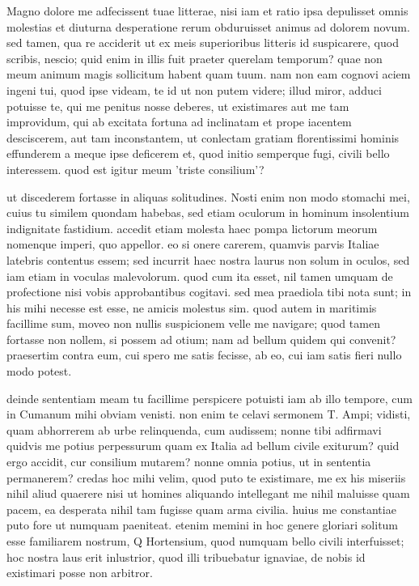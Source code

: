 


 Magno dolore me adfecissent tuae litterae, nisi iam et ratio ipsa depulisset omnis molestias et diuturna desperatione rerum obduruisset animus ad dolorem novum. sed tamen, qua re acciderit ut ex meis superioribus litteris id suspicarere, quod scribis, nescio; quid enim in illis fuit praeter querelam temporum? quae non meum animum magis sollicitum habent quam tuum. nam non eam cognovi aciem ingeni tui, quod ipse videam, te id ut non putem videre; illud miror, adduci potuisse te, qui me penitus nosse deberes, ut existimares aut me tam improvidum, qui ab excitata fortuna ad inclinatam et prope iacentem desciscerem, aut tam inconstantem, ut conlectam gratiam florentissimi hominis effunderem a meque ipse deficerem et, quod initio semperque fugi, civili bello interessem. quod est igitur meum 'triste consilium'?

 ut discederem fortasse in aliquas solitudines. Nosti enim non modo stomachi mei, cuius tu similem quondam habebas, sed etiam oculorum in hominum insolentium indignitate fastidium. accedit etiam molesta haec pompa lictorum meorum nomenque imperi, quo appellor. eo si onere carerem, quamvis parvis Italiae latebris contentus essem; sed incurrit haec nostra laurus non solum in oculos, sed iam etiam in voculas malevolorum. quod cum ita esset, nil tamen umquam de profectione nisi vobis approbantibus cogitavi. sed mea praediola tibi nota sunt; in his mihi necesse est esse, ne amicis molestus sim. quod autem in maritimis facillime sum, moveo non nullis suspicionem velle me navigare; quod tamen fortasse non nollem, si possem ad otium; nam ad bellum quidem qui convenit? praesertim contra eum, cui spero me satis fecisse, ab eo, cui iam satis fieri nullo modo potest.

 deinde sententiam meam tu facillime perspicere potuisti iam ab illo tempore, cum in Cumanum mihi obviam venisti. non enim te celavi sermonem T. Ampi; vidisti, quam abhorrerem ab urbe relinquenda, cum audissem; nonne tibi adfirmavi quidvis me potius perpessurum quam ex Italia ad bellum civile exiturum? quid ergo accidit, cur consilium mutarem? nonne omnia potius, ut in sententia permanerem? credas hoc mihi velim, quod puto te existimare, me ex his miseriis nihil aliud quaerere nisi ut homines aliquando intellegant me nihil maluisse quam pacem, ea desperata nihil tam fugisse quam arma civilia. huius me constantiae puto fore ut numquam paeniteat. etenim memini in hoc genere gloriari solitum esse familiarem nostrum, Q Hortensium, quod numquam bello civili interfuisset; hoc nostra laus erit inlustrior, quod illi tribuebatur ignaviae, de nobis id existimari posse non arbitror.

